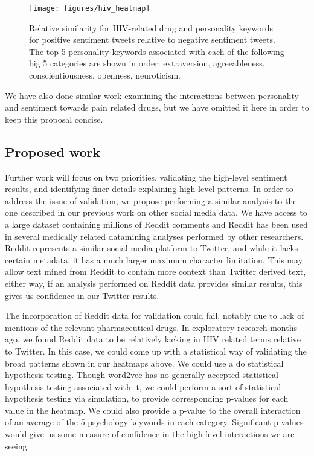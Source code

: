 \begin{figure*}
\centering
\texttt{[image: figures/hiv\_heatmap]}
\caption{Relative similarity for HIV-related drug and personality keywords for positive sentiment tweets relative to negative sentiment tweets. The top 5 personality keywords associated with each of the following big 5 categories are shown in order: extraversion, agreeableness, conscientiousness, openness, neuroticism.}
\label{fig:hiv_heatmap}
\end{figure*}

We have also done similar work examining the interactions between personality and sentiment towards pain related drugs, but we have omitted it here in order to keep this proposal concise.

\subsection{Proposed work}

Further work will focus on two priorities, validating the high-level sentiment results, and identifying finer details explaining high level patterns. In order to address the issue of validation, we propose performing a similar analysis to the one described in our previous work on other social media data. We have access to a large dataset containing millions of Reddit comments and Reddit has been used in several medically related datamining analyses performed by other researchers\cite{chen2015combining}. Reddit represents a similar social media platform to Twitter, and while it lacks certain metadata, it has a much larger maximum character limitation. This may allow text mined from Reddit to contain more context than Twitter derived text, either way, if an analysis performed on Reddit data provides similar results, this gives us confidence in our Twitter results.

The incorporation of Reddit data for validation could fail, notably due to lack of mentions of the relevant pharmaceutical drugs. In exploratory research months ago, we found Reddit data to be relatively lacking in HIV related terms relative to Twitter. In this case, we could come up with a statistical way of validating the broad patterns shown in our heatmaps above. We could use a do statistical hypothesis testing. Though word2vec has no generally accepted statistical hypothesis testing associated with it, we could perform a sort of statistical hypothesis testing via simulation, to provide corresponding p-values for each value in the heatmap. We could also provide a p-value to the overall interaction of an average of the 5 psychology keywords in each category. Significant p-values would give us some measure of confidence in the high level interactions we are seeing.

